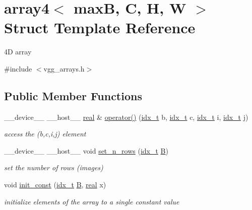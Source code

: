 \hypertarget{structarray4}{}\section{array4$<$ maxB, C, H, W $>$ Struct Template Reference}
\label{structarray4}


4D array  




{\ttfamily \#include $<$vgg\+\_\+arrays.\+h$>$}

\subsection*{Public Member Functions}
\begin{DoxyCompactItemize}
\item 
\+\_\+\+\_\+device\+\_\+\+\_\+ \+\_\+\+\_\+host\+\_\+\+\_\+ \hyperlink{vgg__util_8h_a1082d08aaa761215ec83e7149f27ad16}{real} \& \hyperlink{structarray4_aeaa87655f2ae1ce11e5522db4b28671d}{operator()} (\hyperlink{vgg__util_8h_a8e93478a00e685bea5e6a3f617bf03a3}{idx\+\_\+t} b, \hyperlink{vgg__util_8h_a8e93478a00e685bea5e6a3f617bf03a3}{idx\+\_\+t} c, \hyperlink{vgg__util_8h_a8e93478a00e685bea5e6a3f617bf03a3}{idx\+\_\+t} i, \hyperlink{vgg__util_8h_a8e93478a00e685bea5e6a3f617bf03a3}{idx\+\_\+t} j)
\begin{DoxyCompactList}\small\item\em access the (b,c,i,j) element \end{DoxyCompactList}\item 
\+\_\+\+\_\+device\+\_\+\+\_\+ \+\_\+\+\_\+host\+\_\+\+\_\+ void \hyperlink{structarray4_a202d1a80c9bb76b2fb34e1c2e3146127}{set\+\_\+n\+\_\+rows} (\hyperlink{vgg__util_8h_a8e93478a00e685bea5e6a3f617bf03a3}{idx\+\_\+t} \hyperlink{structarray4_a68aee457ea4034e17475b6ec5c497c12}{B})
\begin{DoxyCompactList}\small\item\em set the number of rows (images) \end{DoxyCompactList}\item 
void \hyperlink{structarray4_a517a9404ca45ae3a0682f9b6a33300a8}{init\+\_\+const} (\hyperlink{vgg__util_8h_a8e93478a00e685bea5e6a3f617bf03a3}{idx\+\_\+t} \hyperlink{structarray4_a68aee457ea4034e17475b6ec5c497c12}{B}, \hyperlink{vgg__util_8h_a1082d08aaa761215ec83e7149f27ad16}{real} x)
\begin{DoxyCompactList}\small\item\em initialize elements of the array to a single constant value \end{DoxyCompactList}\item 

\end{DoxyCompactItemize}
